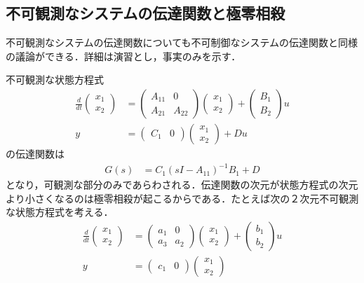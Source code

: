 \subsection{不可観測なシステムの伝達関数と極零相殺}

不可観測なシステムの伝達関数についても不可制御なシステムの伝達関数と同様の議論ができる．詳細は演習とし，事実のみを示す．

不可観測な状態方程式
\begin{align}
 \frac{d}{dt}
  \left(\begin{array}{c}
         {x}_1 \\
	 {x}_2 
	\end{array}\right)
  &=
  \left(\begin{array}{cc}
         {A}_{11} & 0 \\
	     {A}_{21} & {A}_{22}
	\end{array}\right)
  \left(\begin{array}{c}
         {x}_1 \\
	 {x}_2 
	\end{array}\right)
  +
  \left(\begin{array}{c}
         {B}_1 \\
	 {B}_2
	\end{array}\right)
  u \\
 y &=
  \left(\begin{array}{cc}
         {C}_1 & 0
	\end{array}\right)
  \left(\begin{array}{c}
         {x}_1 \\
	 {x}_2 
	\end{array}\right)
  + D u
\end{align}
の伝達関数は
\begin{align}
	G(s) &= {C}_1 (sI - {A}_{11})^{-1} {B}_1 + D
\end{align}
となり，可観測な部分のみであらわされる．伝達関数の次元が状態方程式の次元より小さくなるのは極零相殺が起こるからである．たとえば次の２次元不可観測な状態方程式を考える．
\begin{align}
 \frac{d}{dt}
  \left(\begin{array}{c}
         {x}_1 \\
	 {x}_2 
	\end{array}\right)
  &=
  \left(\begin{array}{cc}
         a_1 & 0 \\
	     a_3 & a_2
	\end{array}\right)
  \left(\begin{array}{c}
         {x}_1 \\
	 {x}_2 
	\end{array}\right)
  +
  \left(\begin{array}{c}
         b_1 \\
	 b_2
	\end{array}\right)
  u \\
 y &=
  \left(\begin{array}{cc}
         c_1 & 0 
	\end{array}\right)
  \left(\begin{array}{c}
         {x}_1 \\
	 {x}_2 
	\end{array}\right)
\end{align}
